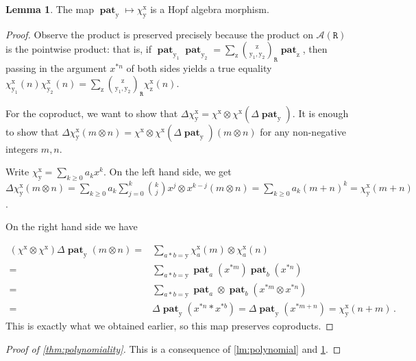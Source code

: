 \documentclass[12pt, reqno]{amsart}
\theoremstyle{definition}
\newtheorem{lm}[thm]{Lemma}
\DeclareMathOperator{\pat}{\mathbf{pat}}
\newcommand{\xx}{\mathrm{x}}
\newcommand{\yy}{\mathrm{y}}
\newcommand{\zz}{\mathrm{z}}
\begin{document}
\begin{lm}\label{lm:HA_morphism}
The map $\pat_{\yy} \mapsto \chi^{\xx}_{\yy}$ is a Hopf algebra morphism.
\end{lm}

\begin{proof}
   Observe the product is preserved precisely because the product on $\mathcal{A}(\mathtt{R})$ is the pointwise product: that is, if $\pat_{\yy_1} \pat_{\yy_2} = \sum_{\zz} \binom{\zz}{\yy_1, \yy_2}_{\mathtt{R}} \pat_{\zz}$, then passing in the argument $x^{\ast n}$ of both sides yields a true equality $\chi^{\xx}_{\yy_1}(n) \chi^{\xx}_{\yy_2}(n) = \sum_{\zz} \binom{\zz}{\yy_1, \yy_2}_{\mathtt{R}} \chi^{\xx}_{\zz}(n)  $.

    For the coproduct, we want to show that $\Delta \chi^{\xx}_{\yy} = \chi^{\xx} \otimes \chi^{\xx}(\Delta \pat_{\yy})$.
    It is enough to show that $\Delta \chi^{\xx}_{\yy} (m \otimes n) = \chi^{\xx} \otimes \chi^{\xx}(\Delta \pat_{\yy})(m\otimes n) $ for any non-negative integers $m, n$.

    Write $\chi^{\xx}_{\yy} = \sum_{k\geq 0 } a_k x^k$.
    On the left hand side, we get $\Delta \chi^{\xx}_{\yy} (m \otimes n) = \sum_{k \geq 0} a_k \sum_{j=0}^k \binom{k}{j} x^j\otimes x^{k-j} (m \otimes n) = \sum_{k \geq 0} a_k (m+n)^k = \chi^{\xx}_{\yy}(m+n) $.

    On the right hand side we have 
    
    
    \begin{equation*}
        \begin{split}
        (\chi^{\xx} \otimes \chi^{\xx})\Delta \pat_{\yy}(m\otimes n) =& \sum_{a \ast b = \yy} \chi^{\xx}_a(m) \otimes \chi^{\xx}_a(n)\\
        =& \sum_{a \ast b = \yy} \pat_a(x^{\ast m})\pat_b(x^{\ast n})\\
        =& \sum_{a \ast b = \yy} \pat_a\otimes \pat_b ( x^{\ast m} \otimes x^{\ast n})\\
        =& \Delta \pat_{\yy}(x^{\ast n} \ast x^{\ast b}) = \Delta \pat_{\yy}(x^{\ast m+n}) = \chi^{\xx}_{\yy}(n+m)\, .
        \end{split}
    \end{equation*}
    This is exactly what we obtained earlier, so this map preserves coproducts.
\end{proof}


\begin{proof}[Proof of \cref{thm:polynomiality}]
This is a consequence of \cref{lm:polynomial} and \cref{lm:HA_morphism}.
\end{proof}
\end{document}
